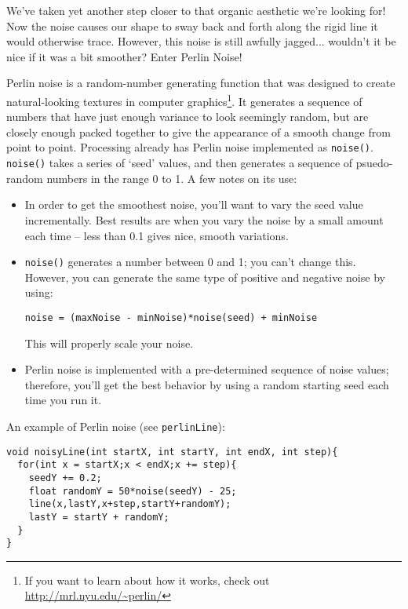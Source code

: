 We've taken yet another step closer to that organic aesthetic we're looking for!  Now the noise causes our shape to sway back and forth along the rigid line it would otherwise trace.  However, this noise is still awfully jagged... wouldn't it be nice if it was a bit smoother?  Enter Perlin Noise!

Perlin noise is a random-number generating function that was designed to create natural-looking textures in computer graphics\footnote{If you want to learn about how it works, check out \url{http://mrl.nyu.edu/~perlin/}}.  It generates a sequence of numbers that have just enough variance to look seemingly random, but are closely enough packed together to give the appearance of a smooth change from point to point.  Processing already has Perlin noise implemented as \texttt{noise()}.  \texttt{noise()} takes a series of `seed' values, and then generates a sequence of psuedo-random numbers in the range 0 to 1.  A few notes on its use:

\begin{itemize}
\item In order to get the smoothest noise, you'll want to vary the seed value incrementally.  Best results are when you vary the noise by a small amount each time -- less than 0.1 gives nice, smooth variations.
\item \texttt{noise()} generates a number between 0 and 1; you can't change this.  However, you can generate the same type of positive and negative noise by using: \\
\begin{center}
{\tt noise = (maxNoise - minNoise)*noise(seed) + minNoise}
\end{center}

This will properly scale your noise.
\item Perlin noise is implemented with a pre-determined sequence of noise values; therefore, you'll get the best behavior by using a random starting seed each time you run it.
\end{itemize}

An example of Perlin noise (see \texttt{perlinLine}):

\begin{verbatim}
void noisyLine(int startX, int startY, int endX, int step){
  for(int x = startX;x < endX;x += step){
    seedY += 0.2;
    float randomY = 50*noise(seedY) - 25;
    line(x,lastY,x+step,startY+randomY);
    lastY = startY + randomY;
  }
}
\end{verbatim}

